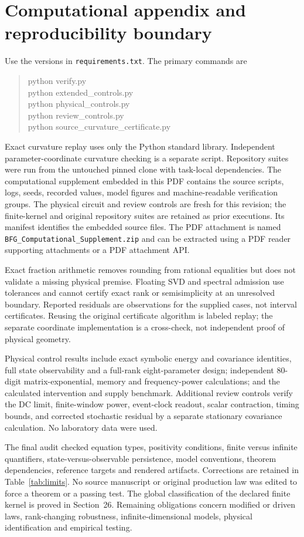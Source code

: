 \documentclass[11pt,letterpaper]{article}
\theoremstyle{definition}
\numberwithin{equation}{section}
\begin{document}
\section{Computational appendix and reproducibility boundary}
Use the versions in \texttt{requirements.txt}. The primary commands are
\begin{quote}\ttfamily
python verify.py\\
python extended\_controls.py\\
python physical\_controls.py\\
python review\_controls.py\\
python source\_curvature\_certificate.py
\end{quote}
Exact curvature replay uses only the Python standard library. Independent parameter-coordinate curvature checking is a separate script. Repository suites were run from the untouched pinned clone with task-local dependencies. The computational supplement embedded in this PDF contains the source scripts, logs, seeds, recorded values, model figures and machine-readable verification groups. The physical circuit and review controls are fresh for this revision; the finite-kernel and original repository suites are retained as prior executions. Its manifest identifies the embedded source files. The PDF attachment is named \texttt{BFG\_Computational\_Supplement.zip} and can be extracted using a PDF reader supporting attachments or a PDF attachment API.

Exact fraction arithmetic removes rounding from rational equalities but does not validate a missing physical premise. Floating SVD and spectral admission use tolerances and cannot certify exact rank or semisimplicity at an unresolved boundary. Reported residuals are observations for the supplied cases, not interval certificates. Reusing the original certificate algorithm is labeled replay; the separate coordinate implementation is a cross-check, not independent proof of physical geometry.

Physical control results include exact symbolic energy and covariance identities, full state observability and a full-rank eight-parameter design; independent 80-digit matrix-exponential, memory and frequency-power calculations; and the calculated intervention and supply benchmark. Additional review controls verify the DC limit, finite-window power, event-clock readout, scalar contraction, timing bounds, and corrected stochastic residual by a separate stationary covariance calculation. No laboratory data were used.

The final audit checked equation types, positivity conditions, finite versus infinite quantifiers, state-versus-observable persistence, model conventions, theorem dependencies, reference targets and rendered artifacts. Corrections are retained in Table~\ref{tab:limits}. No source manuscript or original production law was edited to force a theorem or a passing test. The global classification of the declared finite kernel is proved in Section~26. Remaining obligations concern modified or driven laws, rank-changing robustness, infinite-dimensional models, physical identification and empirical testing.


\end{document}
